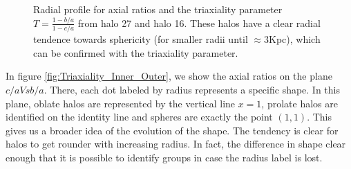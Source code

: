 \begin{figure}
\centering
{}
  \hfill
\caption{Radial profile for axial ratios and the triaxiality parameter $T=\frac{1-b/a}{1-c/a}$ from halo 27 and halo 16. These halos have a clear radial tendence towards sphericity (for smaller radii until $\approx 3$Kpc), which can be confirmed with the triaxiality parameter. }
\label{fig:DM_MHD}
\end{figure} 


In figure \ref{fig:Triaxiality_Inner_Outer}, we show the axial ratios on the plane $c/a Vs b/a$. There, each dot labeled by radius represents a specific shape. In this plane, oblate halos are represented by the vertical line $x = 1$, prolate halos are identified on the identity line and spheres are exactly the point $(1,1)$. This gives us a broader idea of the evolution of the shape. The tendency is clear for halos to get rounder with increasing radius. In fact, the difference in shape clear enough that it is possible to identify groups in case the radius label is lost.\\

